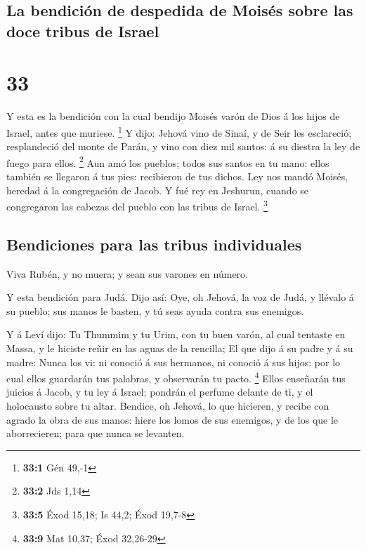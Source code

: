 \hypertarget{la-bendiciuxf3n-de-despedida-de-moisuxe9s-sobre-las-doce-tribus-de-israel}{%
\subsection{La bendición de despedida de Moisés sobre las doce tribus de
Israel}\label{la-bendiciuxf3n-de-despedida-de-moisuxe9s-sobre-las-doce-tribus-de-israel}}

\hypertarget{section-32}{%
\section{33}\label{section-32}}

 Y esta es la bendición con la cual bendijo Moisés varón de
Dios á los hijos de Israel, antes que muriese. \footnote{\textbf{33:1}
  Gén 49,-1}  Y dijo: Jehová vino de Sinaí, y de Seir les
esclareció; resplandeció del monte de Parán, y vino con diez mil santos:
á su diestra la ley de fuego para ellos. \footnote{\textbf{33:2} Jds
  1,14}  Aun amó los pueblos; todos sus santos en tu mano:
ellos también se llegaron á tus pies: recibieron de tus dichos.
 Ley nos mandó Moisés, heredad á la congregación de Jacob.
 Y fué rey en Jeshurun, cuando se congregaron las cabezas
del pueblo con las tribus de Israel. \footnote{\textbf{33:5} Éxod 15,18;
  Is 44,2; Éxod 19,7-8}

\hypertarget{bendiciones-para-las-tribus-individuales}{%
\subsection{Bendiciones para las tribus
individuales}\label{bendiciones-para-las-tribus-individuales}}

 Viva Rubén, y no muera; y sean sus varones en número.

 Y esta bendición para Judá. Dijo así: Oye, oh Jehová, la
voz de Judá, y llévalo á su pueblo; sus manos le basten, y tú seas ayuda
contra sus enemigos.

 Y á Leví dijo: Tu Thummim y tu Urim, con tu buen varón, al
cual tentaste en Massa, y le hiciste reñir en las aguas de la rencilla;
 El que dijo á su padre y á su madre: Nunca los vi: ni
conoció á sus hermanos, ni conoció á sus hijos: por lo cual ellos
guardarán tus palabras, y observarán tu pacto. \footnote{\textbf{33:9}
  Mat 10,37; Éxod 32,26-29}  Ellos enseñarán tus juicios á
Jacob, y tu ley á Israel; pondrán el perfume delante de ti, y el
holocausto sobre tu altar.  Bendice, oh Jehová, lo que
hicieren, y recibe con agrado la obra de sus manos: hiere los lomos de
sus enemigos, y de los que le aborrecieren; para que nunca se levanten.

